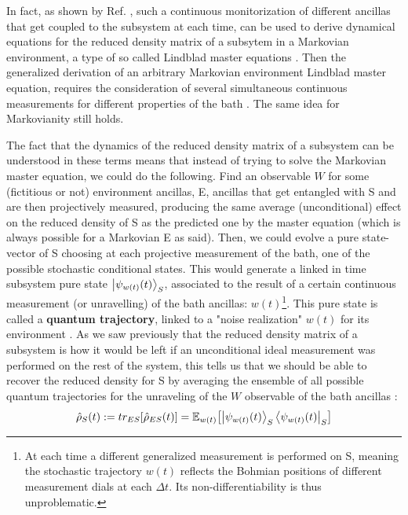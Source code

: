 \documentclass[11pt, a4paper]{article} %
\begin{document}
In fact, as shown by Ref. \cite{continousMeas}, such a continuous monitorization of different ancillas that get coupled to the subsystem at each time, can be used to derive dynamical equations for the reduced density matrix of a subsytem in a Markovian environment, a type of so called Lindblad master equations \cite{Generalized, MarkovianityDefs}. Then the generalized derivation of an arbitrary Markovian environment Lindblad master equation, requires the consideration of several simultaneous continuous measurements for different properties of the bath \cite{continousMeas, MarkovianityDefs}. The same idea for Markovianity still holds.

The fact that the dynamics of the reduced density matrix of a subsystem can be understood in these terms means that instead of trying to solve the Markovian master equation, we could do the following. Find an observable $W$ for some (fictitious or not) environment ancillas, E, ancillas that get entangled with S and are then projectively measured, producing the same average (unconditional) effect on the reduced density of S as the predicted one by the master equation (which is always possible for a Markovian E as said). Then, we could evolve a pure state-vector of S choosing at each projective measurement of the bath, one of the possible stochastic conditional states. This would generate a linked in time subsystem pure state $\ket{\psi_{w(t)}(t)}_S$, associated to the result of a certain continuous measurement (or unravelling) of the bath ancillas: $w(t)$\footnote{At each time a different generalized measurement is performed on S, meaning the stochastic trajectory $w(t)$ reflects the Bohmian positions of different measurement dials at each $\Delta t$. Its non-differentiability is thus unproblematic.}. This pure state is called a {\bf quantum trajectory}, linked to a "noise realization" $w(t)$ for its environment \cite{Generalized, MarkovianityDefs, QuantumTrajs}. As we saw previously that the reduced density matrix of a subsystem is how it would be left if an unconditional ideal measurement was performed on the rest of the system, this tells us that we should be able to recover the reduced density for S by averaging the ensemble of all possible quantum trajectories for the unraveling of the $W$ observable of the bath ancillas \cite{MarkovianityDefs,QuantumTrajs}:\vspace{-0.17cm}
\begin{equation}
\hat{\rho}_S(t):=tr_{ES}[\hat{\rho}_{ES}(t)]=\mathbb{E}_{w(t)}\qty[\ket{\psi_{w(t)}(t)}_S\bra{\psi_{w(t)}(t)}_S] \vspace{-0.13cm}
\end{equation}
\end{document}
